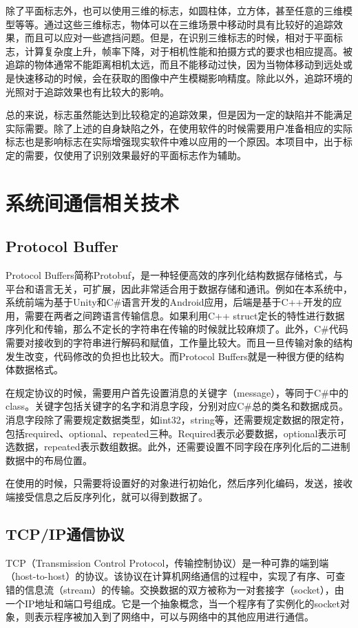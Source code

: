 除了平面标志外，也可以使用三维的标志，如圆柱体，立方体，甚至任意的三维模型等等。通过这些三维标志，物体可以在三维场景中移动时具有比较好的追踪效果，而且可以应对一些遮挡问题。但是，在识别三维标志的时候，相对于平面标志，计算复杂度上升，帧率下降，对于相机性能和拍摄方式的要求也相应提高。被追踪的物体通常不能距离相机太远，而且不能移动过快，因为当物体移动到远处或是快速移动的时候，会在获取的图像中产生模糊影响精度。除此以外，追踪环境的光照对于追踪效果也有比较大的影响。

总的来说，标志虽然能达到比较稳定的追踪效果，但是因为一定的缺陷并不能满足实际需要。除了上述的自身缺陷之外，在使用软件的时候需要用户准备相应的实际标志也是影响标志在实际增强现实软件中难以应用的一个原因。本项目中，出于标定的需要，仅使用了识别效果最好的平面标志作为辅助。

\section{系统间通信相关技术}
\subsection{Protocol Buffer}
Protocol Buffers简称Protobuf，是一种轻便高效的序列化结构数据存储格式，与平台和语言无关，可扩展，因此非常适合用于数据存储和通讯。例如在本系统中，系统前端为基于Unity和C\#语言开发的Android应用，后端是基于C++开发的应用，需要在两者之间跨语言传输信息。如果利用C++ struct定长的特性进行数据序列化和传输，那么不定长的字符串在传输的时候就比较麻烦了。此外，C\#代码需要对接收到的字符串进行解码和赋值，工作量比较大。而且一旦传输对象的结构发生改变，代码修改的负担也比较大。而Protocol Buffers就是一种很方便的结构体数据格式。

在规定协议的时候，需要用户首先设置消息的关键字（message），等同于C\#中的class。关键字包括关键字的名字和消息字段，分别对应C\#总的类名和数据成员。消息字段除了需要规定数据类型，如int32，string等，还需要规定数据的限定符，包括required、optional、repeated三种。Required表示必要数据，optional表示可选数据，repeated表示数组数据。此外，还需要设置不同字段在序列化后的二进制数据中的布局位置。

在使用的时候，只需要将设置好的对象进行初始化，然后序列化编码，发送，接收端接受信息之后反序列化，就可以得到数据了。

\subsection{TCP/IP通信协议}
	TCP（Transmission Control Protocol，传输控制协议）是一种可靠的端到端（host-to-host）的协议。该协议在计算机网络通信的过程中，实现了有序、可查错的信息流（stream）的传输。交换数据的双方被称为一对套接字（socket），由一个IP地址和端口号组成。它是一个抽象概念，当一个程序有了实例化的socket对象，则表示程序被加入到了网络中，可以与网络中的其他应用进行通信。
	
